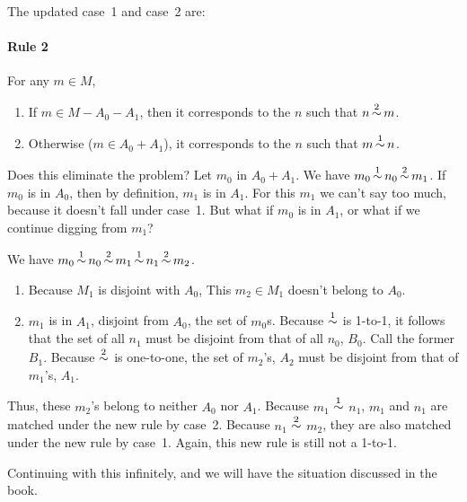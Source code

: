 The updated case~1 and case~2 are:
\paragraph{Rule 2}
For any $m \in M$,
\begin{enumerate}
	\item If $m \in M-A_0-A_1$, then it corresponds to the $n$ such that $n
		\mathop{\sim}\limits^2 m$.
	\item Otherwise ($m \in A_0+A_1$), it corresponds to the $n$ such that $m \mathop{\sim}\limits^1
		n$.
\end{enumerate}

Does this eliminate the problem?  Let $m_0$ in $A_0+A_1$. We have $m_0 \mathop{\sim}\limits^1
n_0 \mathop{\sim}\limits^2 m_1$.  If $m_0$ is in $A_0$, then by definition, $m_1$ is in $A_1$.
For this $m_1$ we can't say too much, because it doesn't fall under case~1. But
what if $m_0$ is in $A_1$, or what if we continue digging from $m_1$?

We have $m_0 \mathop{\sim}\limits^1 n_0 \mathop{\sim}\limits^2 m_1 \mathop{\sim}\limits^1 n_1 \mathop{\sim}\limits^2 m_2$. 
\begin{enumerate}
\item Because $M_1$ is disjoint with $A_0$, This $m_2 \in M_1$ doesn't belong
	to $A_0$.
\item $m_1$ is in $A_1$, disjoint from $A_0$, the set of $m_0$s. Because
	$\mathop{\sim}\limits^1$ is 1-to-1, it follows that the set of all $n_1$ must be disjoint
	from that of all $n_0$, $B_0$. Call the former $B_1$. Because $\mathop{\sim}\limits^2$ is
	one-to-one, the set of $m_2$'s, $A_2$ must be disjoint from that of
	$m_1$'s, $A_1$.  
\end{enumerate}

Thus, these $m_2$'s belong to neither $A_0$ nor $A_1$.  Because $m_1$ $\mathop{\sim}\limits^1$
$n_1$, $m_1$ and $n_1$ are matched under the new rule by case~2. Because $n_1$
$\mathop{\sim}\limits^2$ $m_2$, they are also matched under the new rule by case~1. Again, this
new rule is still not a 1-to-1.

Continuing with this infinitely, and we will have the situation discussed in
the book.

